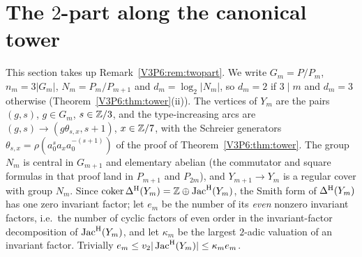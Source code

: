 \section{The $2$-part along the canonical tower}\label{V3P6:sec:twopart}

This section takes up Remark~\ref{V3P6:rem:twopart}. We write $G_m=P/P_m$, $n_m=3|G_m|$,
$N_m=P_m/P_{m+1}$ and $d_m=\log_2|N_m|$, so $d_m=2$ if $3\mid m$ and $d_m=3$ otherwise
(Theorem~\ref{V3P6:thm:tower}(ii)). The vertices of $Y_m$ are the pairs $(g,s)$, $g\in G_m$,
$s\in\mathbb{Z}/3$, and the type-increasing arcs are $(g,s)\to(g\theta_{s,x},s+1)$, $x\in\mathbb{Z}/7$, with
the Schreier generators $\theta_{s,x}=\rho(a_0^{s}a_xa_0^{-(s+1)})$ of the proof of
Theorem~\ref{V3P6:thm:tower}. The group $N_m$ is central in $G_{m+1}$ and elementary abelian
(the commutator and square formulas in that proof land in $P_{m+1}$ and $P_{2m}$), and
$Y_{m+1}\to Y_m$ is a regular cover with group $N_m$. Since $\operatorname{coker}\Delta^{\mathrm{H}}(Y_m)=\mathbb{Z}\oplus\operatorname{Jac}^{\mathrm{H}}(Y_m)$,
the Smith form of $\Delta^{\mathrm{H}}(Y_m)$ has one zero invariant factor; let $e_m$ be the number of its
\emph{even} nonzero invariant factors, i.e.\ the number of cyclic factors of even order in the
invariant-factor decomposition of $\operatorname{Jac}^{\mathrm{H}}(Y_m)$, and let $\kappa_m$ be the largest $2$-adic
valuation of an invariant factor. Trivially $e_m\le v_2|\operatorname{Jac}^{\mathrm{H}}(Y_m)|\le\kappa_me_m$.

